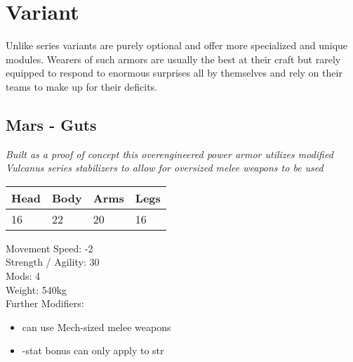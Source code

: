 \documentclass[12pt,a4paper,openany]{book}
\begin{document}
	\section{Variant}
	Unlike series variants are purely optional and offer more specialized and unique modules. Wearers of such armors are usually the best at their craft but rarely equipped to respond to enormous surprises all by themselves and rely on their teams to make up for their deficits.
	\subsection{Mars - Guts}
	\textit{Built as a proof of concept this overengineered power armor utilizes modified Vulcanus series stabilizers to allow for oversized melee weapons to be used}\par
	\begin{tabular}{|l|l|l|l|}
		\hline
		Head & Body & Arms & Legs\\
		\hline
		16 & 22 & 20 & 16\\
		\hline
	\end{tabular}
	\par
	Movement Speed: -2\\
	Strength / Agility: 30\\
	Mods: 4\\
	Weight: 540kg\\
	Further Modifiers:
	\vspace{-8mm}
	\begin{itemize}
		\setlength\itemsep{-8mm}
		\item can use Mech-sized melee weapons
		\item -stat bonus can only apply to str
	\end{itemize}
	\par
\end{document}

